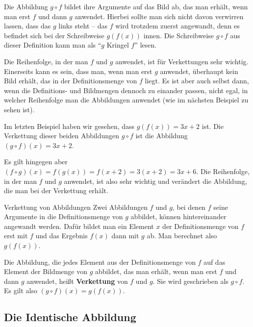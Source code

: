 \documentclass[../../main.tex]{subfiles}
\begin{document}
Die Abbildung $g\circ f$ bildet ihre Argumente auf das Bild ab, das man erhält, wenn man erst $f$ und dann $g$ anwendet. Hierbei sollte man sich nicht davon verwirren lassen, dass das $g$ links steht -- das $f$ wird trotzdem zuerst angewandt, denn es befindet sich bei der Schreibweise $g(f(x))$ innen. Die Schreibweise $g\circ f$ aus dieser Definition kann man als \enquote{$g$ Kringel $f$} lesen.

Die Reihenfolge, in der man $f$ und $g$ anwendet, ist für Verkettungen sehr wichtig. Einerseits kann es sein, dass man, wenn man erst $g$ anwendet, überhaupt kein Bild erhält, das in der Definitionsmenge von $f$ liegt. Es ist aber auch selbst dann, wenn die Definitions- und Bildmengen dennoch zu einander passen, nicht egal, in welcher Reihenfolge man die Abbildungen anwendet (wie im nächsten Beispiel zu sehen ist).

\begin{example}
    Im letzten Beispiel haben wir gesehen, dass $g(f(x))=3x+2$ ist. Die Verkettung dieser beiden Abbildungen $g\circ f$ ist die Abbildung $(g\circ f)(x)=3x+2$.
    
    Es gilt hingegen aber $(f\circ g)(x)=f(g(x))=f(x+2)=3(x+2)=3x+6$. Die Reihenfolge, in der man $f$ und $g$ anwendet, ist also sehr wichtig und verändert die Abbildung, die man bei der Verkettung erhält.
\end{example}

\begin{nutshell}{Verkettung von Abbildungen}
    \parpic[r]{}
    Zwei Abbildungen $f$ und $g$, bei denen $f$ seine Argumente in die Definitionsmenge von $g$ abbildet, können hintereinander angewandt werden. Dafür bildet man ein Element $x$ der Definitionsmenge von $f$ erst mit $f$ und das Ergebnis $f(x)$ dann mit $g$ ab. Man berechnet also $g(f(x))$.
      
    Die Abbildung, die jedes Element aus der Definitionsmenge von $f$ auf das Element der Bildmenge von $g$ abbildet, das man erhält, wenn man erst $f$ und dann $g$ anwendet, heißt \textbf{Verkettung} von $f$ und $g$. Sie wird geschrieben als $g\circ f$. Es gilt also $(g\circ f)(x)=g(f(x))$.
\end{nutshell}

\subsection{Die Identische Abbildung}
\label{sec:abbildungen_identitaet}
\end{document}
